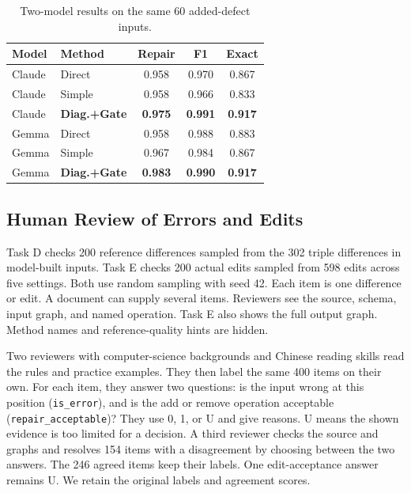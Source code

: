 \begin{table}[t]
\centering
\caption{Two-model results on the same 60 added-defect inputs.}
\label{tab:cross_model}
\small
\begin{tabular}{l l c c c}
\toprule
Model & Method & Repair & F1 & Exact \\
\midrule
Claude & Direct & 0.958 & 0.970 & 0.867 \\
Claude & Simple & 0.958 & 0.966 & 0.833 \\
Claude & \textbf{Diag.+Gate} & \textbf{0.975} & \textbf{0.991} & \textbf{0.917} \\
\midrule
Gemma & Direct & 0.958 & 0.988 & 0.883 \\
Gemma & Simple & 0.967 & 0.984 & 0.867 \\
Gemma & \textbf{Diag.+Gate} & \textbf{0.983} & \textbf{0.990} & \textbf{0.917} \\
\bottomrule
\end{tabular}
\end{table}






\subsection{Human Review of Errors and Edits}
\label{sec:eval:human}

Task D checks 200 reference differences sampled from the 302 triple
differences in model-built inputs. Task E checks 200 actual edits sampled
from 598 edits across five settings. Both use random sampling with seed 42.
Each item is one difference or edit. A document can supply several items.
Reviewers see the source, schema, input graph, and named operation.
Task E also shows the full output graph. Method names and reference-quality
hints are hidden.

Two reviewers with computer-science backgrounds and Chinese reading skills
read the rules and practice examples. They then label the same 400 items
on their own. For each item, they answer two questions: is the input wrong
at this position (\texttt{is\_error}), and is the add or remove operation
acceptable (\texttt{repair\_acceptable})? They use 0, 1, or U and give reasons.
U means the shown evidence is too limited for a decision.
A third reviewer checks the source and graphs and resolves 154 items with
a disagreement by choosing between the two answers. The 246 agreed items
keep their labels. One edit-acceptance answer remains U.
We retain the original labels and agreement scores.

